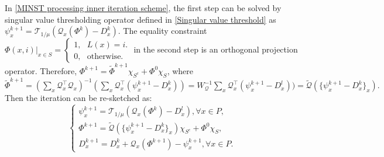 \documentclass[letterpaper,10pt]{article}
\begin{document}
In \eqref{MINST processing inner iteration scheme}, the first step can be solved by singular value thresholding operator defined in \eqref{Singular value threshold} as $\psi_x^{k+1} = \mathcal{T}_{1/\mu}(\mathcal{Q}_x (\Phi^{k}) -D_{x}^{k})$. The equality constraint $ \Phi(x,i)|_{x \in S} = \begin{cases}1,  \ \ \ L(x) = i.\\0, \ \ \ \text{otherwise}. \end{cases}$ in the second step is an orthogonal projection operator. Therefore, ${\Phi}^{k+1} = \tilde{\Phi}^{k+1} \chi_{S^c} + \Phi^0 \chi_{S}$, where $\tilde{\Phi}^{k+1} =  (\sum_{x} \mathcal{Q}_x^{\top} \mathcal{Q}_x)^{-1} (\sum_{x} \mathcal{Q}_x^{\top}({\psi_x^{k+1}} - D_{x}^{k})) = W_{{\mathcal{Q}}}^{-1}\sum_{x} \mathcal{Q}_x^{\top}({\psi_x^{k+1}} - D_{x}^{l})) = \tilde{\mathcal{Q}} (\{\psi_x^{k+1}-D_{x}^k\}_x).$ Then the iteration can be re-sketched as:
\begin{equation}\label{MINST processing inner iteration scheme resc}
\begin{cases}
\psi_x^{k+1} = \mathcal{T}_{1/\mu}(\mathcal{Q}_x (\Phi^{k}) -D_{x}^{l}) , \forall x \in P,\\
{\Phi}^{k+1} =  \tilde{\mathcal{Q}} (\{\psi_x^{k+1}-D_{x}^k\}_x) \chi_{S^c} + \Phi^0 \chi_{S},\\
D_x^{k+1} = D_x^k + \mathcal{Q}_x (\Phi^{k+1}) - \psi_x^{k+1}, \forall x \in P.
\end{cases}
\end{equation}
\end{document}
